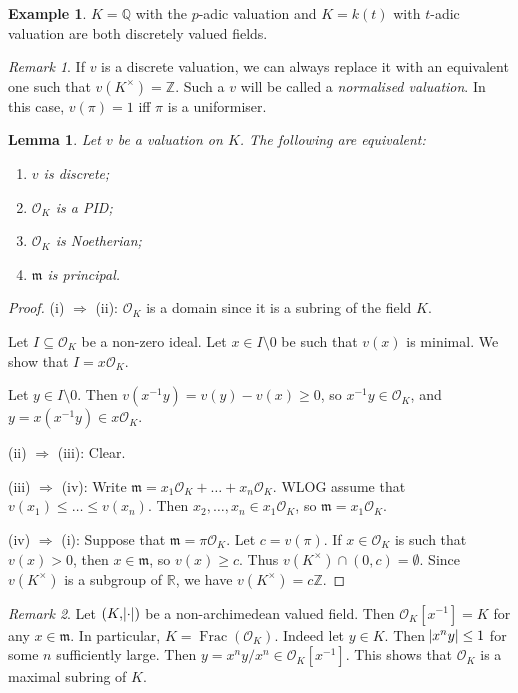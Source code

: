 \documentclass[11pt]{article}
\theoremstyle{definition}
\newtheorem*{example}{Example}
\theoremstyle{plain}
\newtheorem{lemma}[definition]{Lemma}
\theoremstyle{remark}
\newtheorem*{remark}{Remark}
\DeclareMathOperator{\Frac}{Frac}
\newcommand{\ZZ}{\mathbb{Z}}
\newcommand{\QQ}{\mathbb{Q}}
\newcommand{\RR}{\mathbb{R}}
\newcommand{\cO}{\mathcal{O}}
\newcommand{\fm}{\mathfrak{m}}
\begin{document}
\begin{example}
    $K = \QQ$ with the $p$-adic valuation and $K = k(t)$ with $t$-adic valuation are both discretely valued fields.
\end{example}

\begin{remark}
    If $v$ is a discrete valuation, we can always replace it with an equivalent one such that $v(K^\times) = \ZZ$. Such a $v$ will be called a \emph{normalised valuation}. In this case, $v(\pi) = 1$ iff $\pi$ is a uniformiser.
\end{remark}

\begin{lemma}\label{lem:2_6}
    Let $v$ be a valuation on $K$. The following are equivalent:
    \begin{enumerate}
        \item $v$ is discrete;
        \item $\cO_K$ is a PID;
        \item $\cO_K$ is Noetherian;
        \item $\fm$ is principal.
    \end{enumerate}
\end{lemma}
\begin{proof}
    (i) $\Rightarrow$ (ii): $\cO_K$ is a domain since it is a subring of the field $K$.

    Let $I \subseteq \cO_K$ be a non-zero ideal. Let $x \in I \setminus 0$ be such that $v(x)$ is minimal. We show that $I = x \cO_K$.

    Let $y \in I \setminus 0$. Then $v(x^{-1} y) = v(y) - v(x) \ge 0$, so $x^{-1} y \in \cO_K$, and $y = x(x^{-1} y) \in x \cO_K$.

    \noindent (ii) $\Rightarrow$ (iii): Clear.

    \noindent (iii) $\Rightarrow$ (iv): Write $\fm = x_1 \cO_K + \ldots + x_n \cO_K$. WLOG assume that $v(x_1) \le \ldots \le v(x_n)$. Then $x_2, \ldots, x_n \in x_1 \cO_K$, so $\fm = x_1 \cO_K$.

    \noindent (iv) $\Rightarrow$ (i): Suppose that $\fm = \pi \cO_K$. Let $c = v(\pi)$. If $x \in \cO_K$ is such that $v(x) > 0$, then $x \in \fm$, so $v(x) \ge c$. Thus $v(K^\times) \cap (0, c) = \emptyset$. Since $v(K^\times)$ is a subgroup of $\RR$, we have $v(K^\times) = c \ZZ$.
\end{proof}

\begin{remark}
    Let $(K, \abs{\cdot})$ be a non-archimedean valued field. Then $\cO_K[x^{-1}] = K$ for any $x \in \fm$. In particular, $K = \Frac(\cO_K)$. Indeed let $y \in K$. Then $\abs{x^n y} \le 1$ for some $n$ sufficiently large. Then $y = x^n y / x^n \in \cO_K[x^{-1}]$. This shows that $\cO_K$ is a maximal subring of $K$.
\end{remark}
\end{document}
